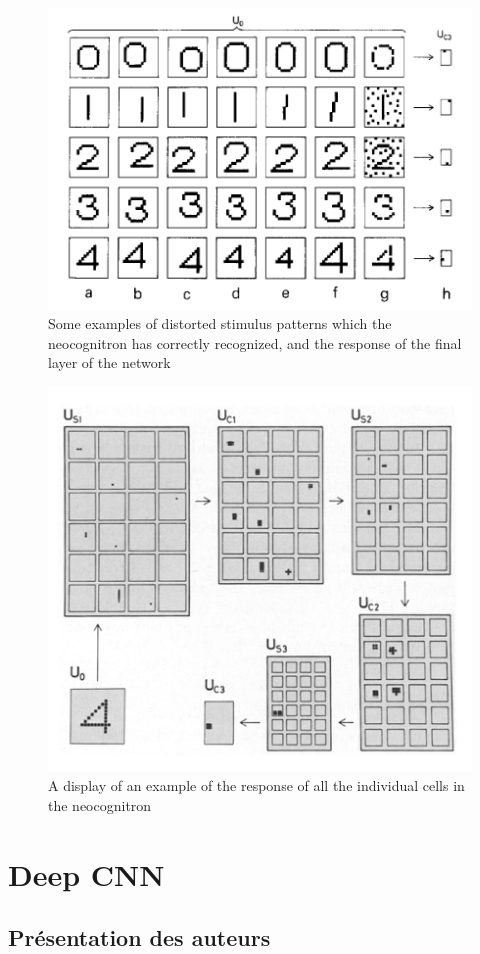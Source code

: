 \documentclass[12pt, letterpaper]{article}
\begin{document}
\begin{figure}[H]
    \includegraphics[width=\linewidth]{img/fig5.png}
    \caption{Some examples of distorted  stimulus patterns  which the neocognitron has correctly recognized, and the response of the final layer of the network }
    \label{fig:L5}
\end{figure}
\begin{figure}[H]
    \includegraphics[width=\linewidth]{img/fig6.png}
    \caption{A display of an  example of the response of all the individual cells in the neocognitron}
    \label{fig:L6}
\end{figure}

\section{Deep CNN}
\subsection{Présentation des auteurs}



\newpage
\printbibliography
\end{document}
